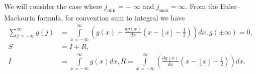 \documentclass[titlepage,fleqn]{article}%
\begin{document}
\label{InfinitLimit}%
We will consider the case where $j_{\min_{{}}}=-$ $\infty$ and $j_{\max
}=\infty.$ From the Euler--Maclaurin formula, for convention sum to integral
we have%
\begin{align}%
{\displaystyle\sum\limits_{j=-\infty}^{\infty}}
g(j)  &  =%
{\displaystyle\int\limits_{x=-\infty}^{\infty}}
\left(  g(x)+\frac{dg(x)}{dx}\left(  x-\left\lfloor x\right\rfloor -\frac
{1}{2}\right)  \right)  dx,g(\pm\infty)=0,\label{EM1}\\
S  &  =I+R,\nonumber\\
I  &  =%
{\displaystyle\int\limits_{x=-\infty}^{\infty}}
g(x)dx,R=%
{\displaystyle\int\limits_{x=-\infty}^{\infty}}
\left(  \frac{dg(x)}{dx}\left(  x-\left\lfloor x\right\rfloor -\frac{1}%
{2}\right)  \right)  dx.\nonumber
\end{align}
\end{document}
